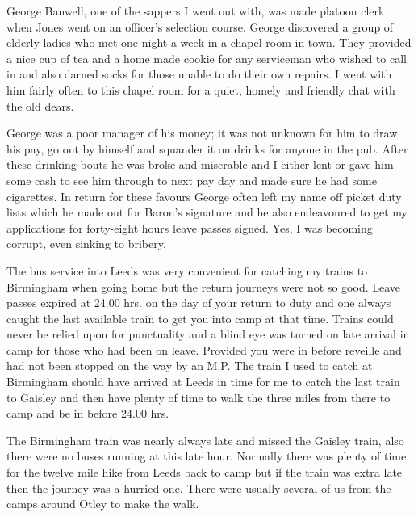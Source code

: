 George Banwell, one of the sappers I went out with, was made platoon
clerk when Jones went on an officer's selection course. George
discovered a group of elderly ladies who met one night a week in a
chapel room in town. They provided a nice cup of tea and a home made
cookie for any serviceman who wished to call in and also darned socks
for those unable to do their own repairs. I went with him fairly often
to this chapel room for a quiet, homely and friendly chat with the
old dears.

George was a poor manager of his money; it was not unknown for him to
draw his pay, go out by himself and squander it on drinks for anyone
in the pub. After these drinking bouts he was broke and miserable and
I either lent or gave him some cash to see him through to next pay day
and made sure he had some cigarettes. In return for these favours
George often left my name off picket duty lists which he made out for
\lieutenant Baron's signature and he also endeavoured to get my
applications for forty-eight hours leave passes signed. Yes, I was
becoming corrupt, even sinking to bribery.

The bus service into Leeds was very convenient for catching my trains
to Birmingham when going home but the return journeys were not so
good. Leave passes expired at 24.00 hrs. on the day of your return to
duty and one always caught the last available train to get you into
camp at that time. Trains could never be relied upon for punctuality
and a blind eye was turned on late arrival in camp for those who had
been on leave. Provided you were in before reveille and had not been
stopped on the way by an M.P. The train I used to catch at Birmingham
should have arrived at Leeds in time for me to catch the last train to
Gaisley and then have plenty of time to walk the three miles from
there to camp and be in before 24.00 hrs.

The Birmingham train was nearly always late and missed the Gaisley
train, also there were no buses running at this late hour. Normally
there was plenty of time for the twelve mile hike from Leeds back to
camp but if the train was extra late then the journey was a hurried
one. There were usually several of us from the camps around Otley to
make the walk.

